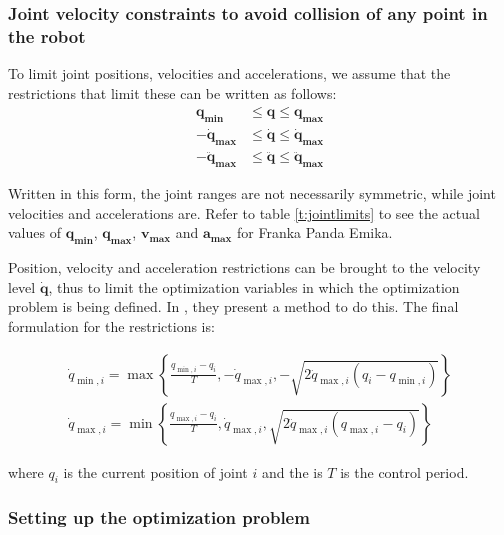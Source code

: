 \blindtext

\subsubsection{Joint velocity constraints to avoid collision of any point in the robot}
\label{sss:flaccobody}


To limit joint positions, velocities and accelerations, we assume that the restrictions that limit these can be written as follows:
$$
\begin{aligned}
    \mathbf{q_{\min}} & \leq \mathbf{q} \leq \mathbf{q_{\max}} \\
    -\mathbf{\dot{q}_{\max}} & \leq \mathbf{\dot{q}} \leq \mathbf{\dot{q}_{\max}} \\
    -\mathbf{\ddot{q}_{\max}} & \leq \mathbf{\ddot{q}} \leq \mathbf{\ddot{q}_{\max}}
\end{aligned}
$$

Written in this form, the joint ranges are not necessarily symmetric, while joint velocities and accelerations are. Refer to table \ref{t:jointlimits} to see the actual values of $\mathbf{q_{\min}}$, $\mathbf{q_{\max}}$, $\mathbf{v_{\max}}$ and $\mathbf{a_{\max}}$ for Franka Panda Emika.

Position, velocity and acceleration restrictions can be brought to the velocity level $\dot{\mathbf{q}}$, thus to limit the optimization variables in which the optimization problem is being defined. In \cite{flacco2012motion}, they present a method to do this. The final formulation for the restrictions is:

\begin{equation}
    \label{eq:jerkylimit}
    \begin{array}{l}
        \dot{q}_{\min , i}=\max \left\{\frac{q_{\min , i}-q_{i}}{T},-\dot{q}_{\max , i},-\sqrt{2 \ddot{q}_{\max , i}\left(q_{i}-q_{\min , i}\right)}\right\} \\
        \dot{q}_{\max , i}=\min \left\{\frac{q_{\max, i}-q_{i}}{T}, \dot{q}_{\max , i}, \sqrt{2 \ddot{q}_{\max , i}\left(q_{\max , i}-q_{i}\right)}\right\}
    \end{array}
\end{equation}


where $q_{i}$ is the current position of joint $i$ and the is $T$ is the control period.



\subsubsection{Setting up the optimization problem}
\label{sss:flaccorepulsive}

